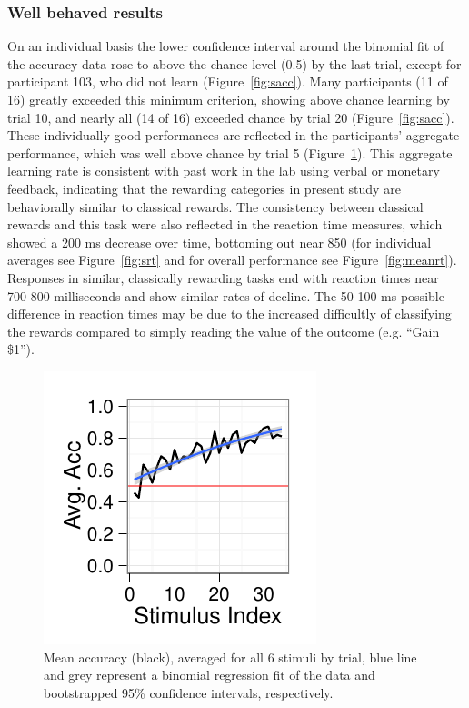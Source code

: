\documentclass[doc,12pt]{apa}        %
\begin{document}
\subsubsection{Well behaved results}
\label{subsub:wellbehaved}
On an individual basis the lower confidence interval around the binomial fit of the accuracy data rose to above the chance level (0.5) by the last trial, except for participant 103, who did not learn (Figure~\ref{fig:sacc}).  Many participants (11 of 16) greatly exceeded this minimum criterion, showing above chance learning by trial 10, and nearly all (14 of 16) exceeded chance by trial 20  (Figure~\ref{fig:sacc}).  These individually good performances are reflected in the participants' aggregate performance, which was well above chance by trial 5 (Figure~\ref{fig:meanacc}).  This aggregate learning rate is consistent with past work in the lab using verbal or monetary feedback, indicating that the rewarding categories in present study are behaviorally similar to classical rewards.  The consistency between classical rewards and this task were also reflected in the reaction time measures, which showed a 200 ms decrease over time, bottoming out near 850 (for individual averages see Figure~\ref{fig:srt} and for overall performance see Figure~\ref{fig:meanrt}).  Responses in similar, classically rewarding tasks end with reaction times near 700-800 milliseconds and show similar rates of decline.  The 50-100 ms possible difference in reaction times may be due to the increased difficultly of classifying the rewards compared to simply reading the value of the outcome (e.g. ``Gain \$1'').

\begin{figure}[tp]
	\includegraphics{f_all_mean_acc}
    \centering
	\caption{Mean accuracy (black), averaged for all 6 stimuli by trial, blue line and grey represent a binomial regression fit of the data and bootstrapped 95\% confidence intervals, respectively.}
	\label{fig:meanacc}
\end{figure}
\end{document}
